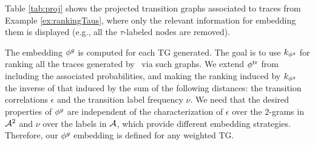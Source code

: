 \begin{example}\label{ex:neue}
Table \ref{tab:proj} shows the projected transition graphs associated to  traces from Example \ref{ex:rankingTaus}, where only the relevant information
for embedding them is displayed (e.g., all the $\tau$-labeled nodes are removed).
\end{example}
%	
The embedding ${\phi^{g}}$ is computed for each TG generated. The goal is to use
$k_{{\phi^{g}}}$ for ranking all the traces generated by \unravelling\ via such graphs. We extend ${\phi^{\text{tr}}}$ from 
\cite{LodhiSSCW02} including the associated probabilities, and making the ranking induced by $k_{{\phi^{g}}}$ the inverse of 
that induced by the
sum of the following distances: the transition correlations $\epsilon$ and the transition label frequency $\nu$.
We need that the desired properties of ${\phi^{g}}$ are independent of the characterization of $\epsilon$ over the 
$2$-grams in $\mathcal{A}^2$ and $\nu$ over the labels in $\mathcal{A}$, which  provide different embedding strategies. Therefore, our 
${\phi^{g}}$ embedding is defined for any weighted TG.


